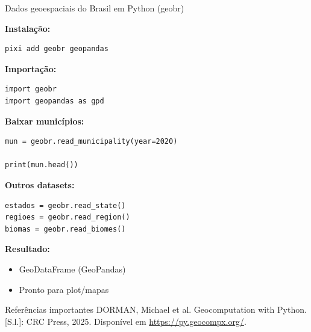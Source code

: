 \documentclass{beamer}
\begin{document}
\begin{frame}[fragile]{Dados geoespaciais do Brasil em Python (geobr)}
	
	\textbf{Instalação:}
	
	\begin{verbatim}
pixi add geobr geopandas
	\end{verbatim}
	
	\vspace{0.3cm}
	
	\textbf{Importação:}
	
	\begin{verbatim}
import geobr
import geopandas as gpd
	\end{verbatim}
	
	\vspace{0.3cm}
	
	\textbf{Baixar municípios:}
	
	\begin{verbatim}
mun = geobr.read_municipality(year=2020)

print(mun.head())
	\end{verbatim}
	
	\vspace{0.3cm}
	
	\textbf{Outros datasets:}
	
	\begin{verbatim}
estados = geobr.read_state()
regioes = geobr.read_region()
biomas = geobr.read_biomes()
	\end{verbatim}
	
	\vspace{0.3cm}
	
	\textbf{Resultado:}
	\begin{itemize}
		\item GeoDataFrame (GeoPandas)
		\item Pronto para plot/mapas
	\end{itemize}
	
\end{frame}

\begin{frame}{Referências importantes}
DORMAN, Michael et al. Geocomputation with Python. [S.l.]: CRC Press, 2025. Disponível em \url{https://py.geocompx.org/}.

\end{frame}
\end{document}
